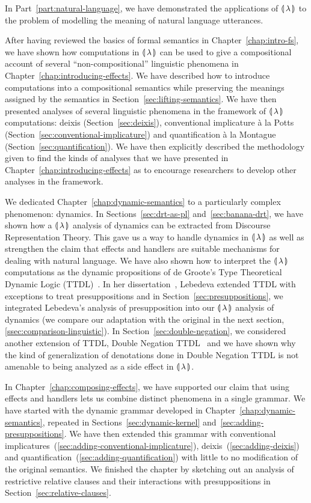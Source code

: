 In Part~\ref{part:natural-language}, we have demonstrated the applications
of ${\llparenthesis \, \lambda \, \rrparenthesis}$ to the problem of modelling the meaning of natural language
utterances.

After having reviewed the basics of formal semantics in
Chapter~\ref{chap:intro-fs}, we have shown how computations in ${\llparenthesis \, \lambda \, \rrparenthesis}$ can
be used to give a compositional account of several ``non-compositional''
linguistic phenomena in Chapter~\ref{chap:introducing-effects}. We have
described how to introduce computations into a compositional semantics
while preserving the meanings assigned by the semantics in
Section~\ref{sec:lifting-semantics}. We have then presented analyses of
several linguistic phenomena in the framework of ${\llparenthesis \, \lambda \, \rrparenthesis}$ computations:
deixis (Section~\ref{sec:deixis}), conventional implicature à la Potts
(Section~\ref{sec:conventional-implicature}) and quantification à la
Montague (Section~\ref{sec:quantification}). We have then explicitly
described the methodology given to find the kinds of analyses that we have
presented in Chapter~\ref{chap:introducing-effects} as to encourage
researchers to develop other analyses in the framework.

We dedicated Chapter~\ref{chap:dynamic-semantics} to a particularly complex
phenomenon: dynamics. In Sections~\ref{sec:drt-as-pl}
and~\ref{sec:banana-drt}, we have shown how a ${\llparenthesis \, \lambda \, \rrparenthesis}$ analysis of dynamics
can be extracted from Discourse Representation Theory. This gave us a way
to handle dynamics in ${\llparenthesis \, \lambda \, \rrparenthesis}$ as well as strengthen the claim that effects
and handlers are suitable mechanisms for dealing with natural language. We
have also shown how to interpret the ${\llparenthesis \, \lambda \, \rrparenthesis}$ computations as the dynamic
propositions of de Groote's Type Theoretical Dynamic Logic
(TTDL)~\cite{de2006towards}. In her
dissertation~\cite{lebedeva2012expression}, Lebedeva extended TTDL with
exceptions to treat presuppositions and in
Section~\ref{sec:presuppositions}, we integrated Lebedeva's analysis of
presupposition into our ${\llparenthesis \, \lambda \, \rrparenthesis}$ analysis of dynamics (we compare our
adaptation with the original in the next section,
\ref{ssec:comparison-linguistic}). In Section~\ref{sec:double-negation}, we
considered another extension of TTDL, Double Negation
TTDL~\cite{qian2014accessibility} and we have shown why the kind of
generalization of denotations done in Double Negation TTDL is not amenable
to being analyzed as a side effect in ${\llparenthesis \, \lambda \, \rrparenthesis}$.

In Chapter~\ref{chap:composing-effects}, we have supported our claim that
using effects and handlers lets us combine distinct phenomena in a single
grammar. We have started with the dynamic grammar developed in
Chapter~\ref{chap:dynamic-semantics}, repeated in
Sections~\ref{sec:dynamic-kernel} and~\ref{sec:adding-presuppositions}. We
have then extended this grammar with conventional
implicatures~(\ref{sec:adding-conventional-implicature}),
deixis~(\ref{sec:adding-deixis}) and
quantification~(\ref{sec:adding-quantification}) with little to no
modification of the original semantics. We finished the chapter by
sketching out an analysis of restrictive relative clauses and their
interactions with presuppositions in Section~\ref{sec:relative-clauses}.


